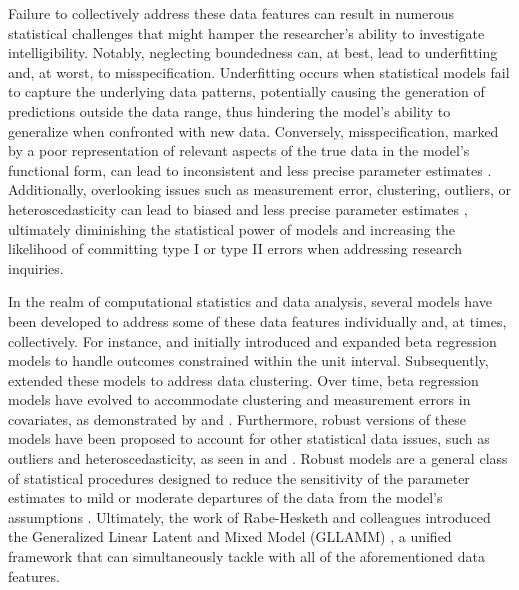 \documentclass[
  authoryear,
  preprint,
  1p]{elsarticle}
\begin{document}
Failure to collectively address these data features can result in
numerous statistical challenges that might hamper the researcher's
ability to investigate intelligibility. Notably, neglecting boundedness
can, at best, lead to underfitting and, at worst, to misspecification.
Underfitting occurs when statistical models fail to capture the
underlying data patterns, potentially causing the generation of
predictions outside the data range, thus hindering the model's ability
to generalize when confronted with new data. Conversely,
misspecification, marked by a poor representation of relevant aspects of
the true data in the model's functional form, can lead to inconsistent
and less precise parameter estimates \citep{Everitt_et_al_2010}.
Additionally, overlooking issues such as measurement error, clustering,
outliers, or heteroscedasticity can lead to biased and less precise
parameter estimates \citep{McElreath_2020}, ultimately diminishing the
statistical power of models and increasing the likelihood of committing
type I or type II errors when addressing research inquiries.

In the realm of computational statistics and data analysis, several
models have been developed to address some of these data features
individually and, at times, collectively. For instance,
\citet{Ferrari_et_al_2004} and \citet{Simas_et_al_2010} initially
introduced and expanded beta regression models to handle outcomes
constrained within the unit interval. Subsequently,
\citet{Figueroa-Zuniga_et_al_2013} extended these models to address data
clustering. Over time, beta regression models have evolved to
accommodate clustering and measurement errors in covariates, as
demonstrated by \citet{Carrasco_et_al_2012} and
\citet{Figueroa-Zuniga_et_al_2018}. Furthermore, robust versions of
these models have been proposed to account for other statistical data
issues, such as outliers and heteroscedasticity, as seen in
\citet{Bayes_et_al_2012} and \citet{Figueroa-Zuniga_et_al_2021}. Robust
models are a general class of statistical procedures designed to reduce
the sensitivity of the parameter estimates to mild or moderate
departures of the data from the model's assumptions
\citep{Everitt_et_al_2010}. Ultimately, the work of Rabe-Hesketh and
colleagues introduced the Generalized Linear Latent and Mixed Model
(GLLAMM)
\citep{Rabe_et_al_2004a, Rabe_et_al_2004b, Rabe_et_al_2004c, Skrondal_et_al_2004a},
a unified framework that can simultaneously tackle with all of the
aforementioned data features.
\end{document}
